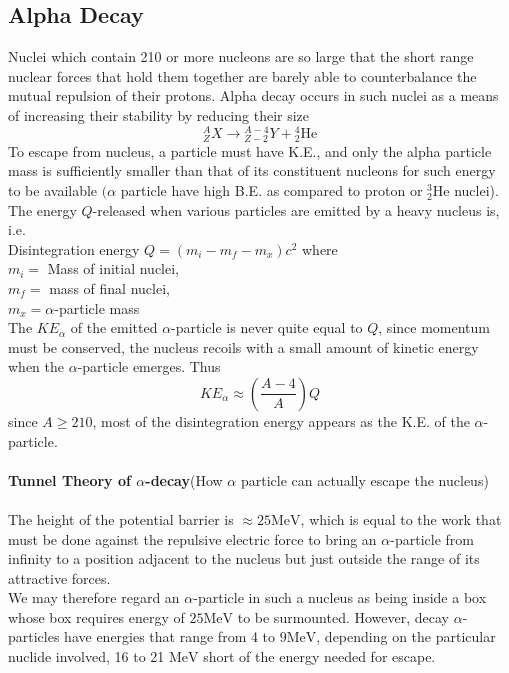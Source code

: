 \subsection{Alpha Decay}
Nuclei which contain 210 or more nucleons are so large that the short range nuclear forces that hold them together are barely able to counterbalance the mutual repulsion of their protons. Alpha decay occurs in such nuclei as a means of increasing their stability by reducing their size
$$
{ }_Z^A X \rightarrow{ }_{Z-2}^{A-4} Y+{ }_2^4 \mathrm{He}
$$
To escape from nucleus, a particle must have K.E., and only the alpha particle mass is sufficiently smaller than that of its constituent nucleons for such energy to be available $(\alpha$ particle have high B.E. as compared to proton or ${ }_2^3 \mathrm{He}$ nuclei).\\
The energy $Q$-released when various particles are emitted by a heavy nucleus is,\\
i.e.\\
Disintegration energy $Q=\left(m_i-m_f-m_x\right) c^2$ where \\
$m_i=$ Mass of initial nuclei,\\
$m_f=$ mass of final nuclei,\\
$m_x=\alpha$-particle mass\\
The $K E_\alpha$ of the emitted $\alpha$-particle is never quite equal to $Q$, since momentum must be conserved, the nucleus recoils with a small amount of kinetic energy when the $\alpha$-particle emerges. Thus
$$
K E_\alpha \approx\left(\frac{A-4}{A}\right) Q
$$
since $A \geq 210$, most of the disintegration energy appears as the K.E. of the $\alpha$-particle.\\\\
\textbf{Tunnel Theory of $\alpha$-decay}(How $\alpha$ particle can actually escape the nucleus)\\\\
The height of the potential barrier is $\approx 25 \mathrm{MeV}$, which is equal to the work that must be done against the repulsive electric force to bring an $\alpha$-particle from infinity to a position adjacent to the nucleus but just outside the range of its attractive forces.\\
We may therefore regard an $\alpha$-particle in such a nucleus as being inside a box whose box requires energy of $25 \mathrm{MeV}$ to be surmounted. However, decay $\alpha$-particles have energies that range from 4 to $9 \mathrm{MeV}$, depending on the particular nuclide involved, 16 to 21 $\mathrm{MeV}$ short of the energy needed for escape.
